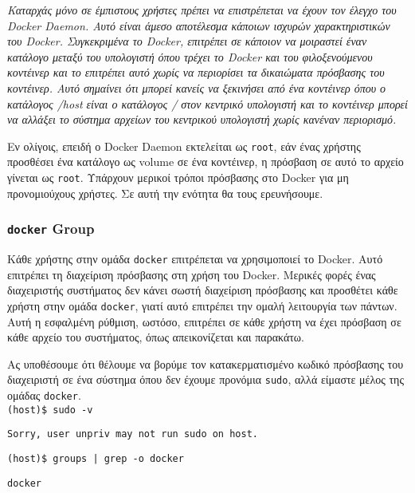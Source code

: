 \emph{Καταρχάς μόνο σε έμπιστους χρήστες πρέπει να επιστρέπεται να έχουν
τον έλεγχο του \textlatin{Docker Daemon}. Αυτό είναι άμεσο αποτέλεσμα κάποιων
ισχυρών χαρακτηριστικών του \textlatin{Docker}. Συγκεκριμένα το
\textlatin{Docker}, επιτρέπει σε κάποιον να μοιραστεί έναν κατάλογο μεταξύ του
υπολογιστή όπου τρέχει το \textlatin{Docker} και του φιλοξενούμενου κοντέινερ
και το επιτρέπει αυτό χωρίς να περιορίσει τα δικαιώματα πρόσβασης του κοντέινερ.
Αυτό σημαίνει ότι μπορεί κανείς να ξεκινήσει από ένα κοντέινερ όπου ο κατάλογος
\textlatin{/host} είναι ο κατάλογος / στον κεντρικό υπολογιστή και το κοντέινερ
μπορεί να αλλάξει το σύστημα αρχείων του κεντρικού υπολογιστή χωρίς κανέναν
περιορισμό.}

Εν ολίγοις, επειδή ο \textlatin{Docker Daemon} εκτελείται ως
\texttt{\textlatin{root}}, εάν ένας χρήστης προσθέσει ένα κατάλογο ως
\textlatin{volume} σε ένα κοντέινερ, η πρόσβαση σε αυτό το αρχείο γίνεται ως
\texttt{\textlatin{root}}. Υπάρχουν μερικοί τρόποι πρόσβασης στο
\textlatin{Docker} για μη προνομιούχους χρήστες. Σε αυτή την ενότητα θα τους
ερευνήσουμε.

\subsubsection{\texttt{\textlatin{docker}} \textlatin{Group}}

Κάθε χρήστης στην ομάδα \texttt{\textlatin{docker}} επιτρέπεται να χρησιμοποιεί
το \textlatin{Docker}.
Αυτό επιτρέπει τη διαχείριση πρόσβασης στη χρήση του \textlatin{Docker}.
Μερικές φορές ένας διαχειριστής συστήματος δεν κάνει σωστή διαχείριση
πρόσβασης και προσθέτει κάθε χρήστη στην ομάδα \texttt{\textlatin{docker}},
γιατί αυτό επιτρέπει την ομαλή λειτουργία των πάντων.
Αυτή η εσφαλμένη ρύθμιση, ωστόσο, επιτρέπει σε κάθε χρήστη να έχει πρόσβαση σε
κάθε αρχείο του συστήματος, όπως απεικονίζεται και παρακάτω.

Ας υποθέσουμε ότι θέλουμε να βορύμε τον κατακερματισμένο κωδικό πρόσβασης του
διαχειριστή σε ένα σύστημα όπου δεν έχουμε προνόμια \texttt{\textlatin{sudo}},
αλλά είμαστε μέλος της ομάδας \texttt{\textlatin{docker}}. \\
 
\texttt{\textlatin{(host)\$ sudo -v}}

\texttt{\textlatin{Sorry, user unpriv may not run sudo on host.}}

\texttt{\textlatin{(host)\$ groups | grep -o docker}}

\texttt{\textlatin{docker}}

